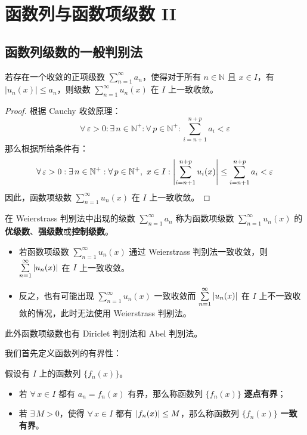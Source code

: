\section{函数列与函数项级数 II}

\subsection{函数列级数的一般判别法}

\begin{theorem}
    若存在一个收敛的正项级数 $\sum\limits_{n = 1}^{\infty} a_n$，使得对于所有 $n \in \mathbb{N}$ 且 $x \in I$，有 $|u_n(x)| \le a_n$，则级数 $\sum\limits_{n = 1}^{\infty} u_n(x)$ 在 $I$ 上一致收敛。

    \begin{proof}
        根据 Cauchy 收敛原理：
        $$
        \forall\,\varepsilon > 0: \exists\,n \in \mathbb{N}^{+}: \forall\,p \in \mathbb{N}^{+}: \sum_{i = n + 1}^{n + p} a_i < \varepsilon
        $$
        那么根据所给条件有：
        $$
        \forall\,\varepsilon > 0: \exists\,n \in \mathbb{N}^{+}: \forall\,p \in \mathbb{N}^{+},\ x \in I: \abs{\sum_{i = n + 1}^{n + p} u_i(x)} \le \sum_{i = n + 1}^{n + p} a_i < \varepsilon
        $$
        因此，函数项级数 $\sum\limits_{n = 1}^{\infty} u_n(x)$ 在 $I$ 上一致收敛。
    \end{proof}
\end{theorem}

在 Weierstrass 判别法中出现的级数 $\sum\limits_{n = 1}^{\infty} a_n$ 称为函数项级数 $\sum\limits_{n = 1}^{\infty} u_n(x)$ 的\textbf{优级数}、\textbf{强级数}或\textbf{控制级数}。

\begin{remark}
    \begin{itemize}
        \item 若函数项级数 $\sum\limits_{n = 1}^{\infty} u_n(x)$ 通过 Weierstrass 判别法一致收敛，则 $\sum\limits_{n = 1}^{\infty} \abs{u_n(x)}$ 在 $I$ 上一致收敛。
        \item 反之，也有可能出现 $\sum\limits_{n = 1}^{\infty} u_n(x)$ 一致收敛而 $\sum\limits_{n = 1}^{\infty} \abs{u_n(x)}$ 在 $I$ 上不一致收敛的情况，此时无法使用 Weierstrass 判别法。
    \end{itemize}
\end{remark}

此外函数项级数也有 Diriclet 判别法和 Abel 判别法。

我们首先定义函数列的有界性：

\begin{definition}[函数列的有界性]
    假设有 $I$ 上的函数列 $\{f_n(x)\}$。
    \begin{itemize}
        \item 若 $\forall\,x \in I$ 都有 $a_n = f_n(x)$ 有界，那么称函数列 $\{f_n(x)\}$ \textbf{逐点有界}；
        \item 若 $\exists\,M > 0$，使得 $\forall\,x \in I$ 都有 $\abs{f_n(x)} \le M$，那么称函数列 $\{f_n(x)\}$ \textbf{一致有界}。
    \end{itemize}
\end{definition}

